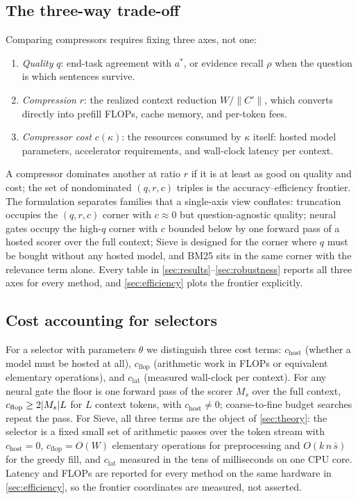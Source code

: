 \documentclass[preprint,12pt]{elsarticle}
\DeclarePairedDelimiter\abs{\lvert}{\rvert}
\theoremstyle{remark}
\newcommand{\method}{Sieve}
\begin{document}
\subsection{The three-way trade-off}
\label{sec:tradeoff}
Comparing compressors requires fixing three axes, not one:
\begin{enumerate}[label=(\roman*)]
\item \emph{Quality} $q$: end-task agreement with $a^{*}$, or evidence
recall $\rho$ when the question is which sentences survive.
\item \emph{Compression} $r$: the realized context reduction
$W / \lVert C' \rVert$, which converts directly into prefill FLOPs,
cache memory, and per-token fees.
\item \emph{Compressor cost} $c(\kappa)$: the resources consumed by
$\kappa$ itself: hosted model parameters, accelerator requirements,
and wall-clock latency per context.
\end{enumerate}
A compressor dominates another at ratio $r$ if it is at least as good
on quality and cost; the set of nondominated $(q, r, c)$ triples is
the accuracy--efficiency frontier. The formulation separates families
that a single-axis view conflates: truncation occupies the $(q, r, c)$
corner with $c \approx 0$ but question-agnostic quality; neural gates
occupy the high-$q$ corner with $c$ bounded below by one forward pass
of a hosted scorer over the full context; \method{} is designed for
the corner where $q$ must be bought without any hosted model, and BM25
sits in the same corner with the relevance term alone. Every table in
\autoref{sec:results}--\autoref{sec:robustness} reports all three axes
for every method, and \autoref{sec:efficiency} plots the frontier
explicitly.

\subsection{Cost accounting for selectors}
For a selector with parameters $\theta$ we distinguish three cost
terms: $c_{\mathrm{host}}$ (whether a model must be hosted at all),
$c_{\mathrm{flop}}$ (arithmetic work in FLOPs or equivalent elementary
operations), and $c_{\mathrm{lat}}$ (measured wall-clock per context).
For any neural gate the floor is one forward pass of the scorer $M_s$
over the full context, $c_{\mathrm{flop}} \ge 2\abs{M_s} L$ for $L$
context tokens, with $c_{\mathrm{host}} \ne 0$; coarse-to-fine budget
searches repeat the pass. For \method{}, all three terms are the
object of \autoref{sec:theory}: the selector is a fixed small set of
arithmetic passes over the token stream with
$c_{\mathrm{host}} = 0$, $c_{\mathrm{flop}} = O(W)$ elementary
operations for preprocessing and $O(k\,n\,\bar{s})$ for the greedy
fill, and $c_{\mathrm{lat}}$ measured in the tens of milliseconds on
one CPU core. Latency and FLOPs are reported for every method on the
same hardware in \autoref{sec:efficiency}, so the frontier
coordinates are measured, not asserted.
\end{document}
